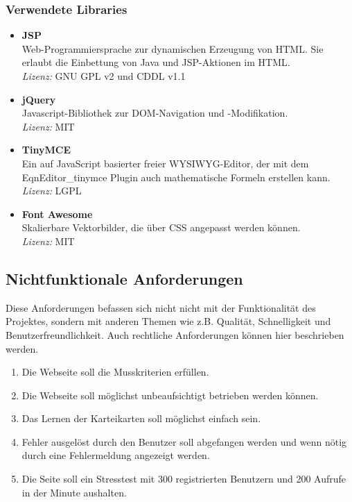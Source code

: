 \subsubsection{Verwendete Libraries}
\begin{itemize}
	\item \textbf{JSP} \\
	Web-Programmiersprache zur dynamischen Erzeugung von HTML. Sie erlaubt die Einbettung von Java und JSP-Aktionen im HTML. \\
	\textit{Lizenz:} GNU GPL v2 und CDDL v1.1
	\item \textbf{jQuery} \\
	Javascript-Bibliothek zur DOM-Navigation und -Modifikation.\\
	\textit{Lizenz:} MIT
	\item \textbf{TinyMCE} \\
	Ein auf JavaScript basierter freier WYSIWYG-Editor, der mit dem EqnEditor\_tinymce Plugin auch mathematische Formeln erstellen kann. \\
	\textit{Lizenz:} LGPL
	\item \textbf{Font Awesome} \\
	Skalierbare Vektorbilder, die über CSS angepasst werden können. \\
	\textit{Lizenz:} MIT
\end{itemize}


\newpage
\subsection{Nichtfunktionale Anforderungen}
Diese Anforderungen befassen sich nicht nicht mit der Funktionalität des Projektes, sondern mit anderen Themen wie z.B. Qualität, Schnelligkeit und Benutzerfreundlichkeit. Auch rechtliche Anforderungen können hier beschrieben werden.

\begin{enumerate}[leftmargin=2cm, label=\bfseries /NF\arabic*0/]
	 \item Die Webseite soll die Musskriterien erfüllen.
     \item Die Webseite soll möglichst unbeaufsichtigt betrieben werden können.
     \item Das Lernen der Karteikarten soll möglichst einfach sein.
     \item Fehler ausgelöst durch den Benutzer soll abgefangen werden und wenn nötig durch eine Fehlermeldung angezeigt werden.
     \item Die Seite soll ein Stresstest mit 300 registrierten Benutzern und 200 Aufrufe in der Minute aushalten.
\end{enumerate}

